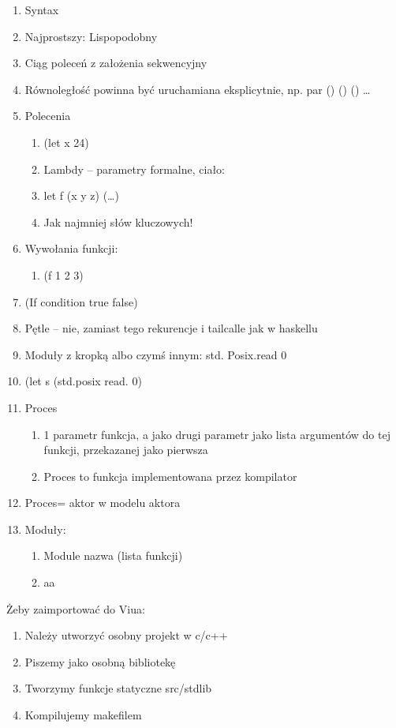 \documentclass[11pt,oneside,a4paper,onecolumn]{article}
\begin{document}
\begin{enumerate}
\item Syntax
\item	Najprostszy: Lispopodobny 
\item	Ciąg poleceń z założenia sekwencyjny
\item	Równoległość powinna być uruchamiana eksplicytnie, np. par () () () …
\item	Polecenia
\begin{enumerate}
	\item (let x 24)
	\item Lambdy – parametry formalne, ciało:
	\item let f (x y z) (…)
	\item Jak najmniej słów kluczowych!
\end{enumerate}
\item Wywołania funkcji:
\begin{enumerate}
	\item (f 1 2 3)
\end{enumerate}
\item (If condition true false)
\item	Pętle – nie, zamiast tego rekurencje i tailcalle jak w haskellu
\item	Moduły z kropką albo czymś innym: std. Posix.read 0
\item	(let s (std.posix read. 0)
\item	Proces
\begin{enumerate}
	\item	1 parametr funkcja, a jako drugi parametr jako lista argumentów do tej funkcji, przekazanej jako pierwsza
	\item Proces to funkcja implementowana przez kompilator
\end{enumerate}
\item	Proces= aktor w modelu aktora
\item	Moduły:	
\begin{enumerate}
	\item	Module nazwa (lista funkcji)
	\item	aa
\end{enumerate}
\end{enumerate}


Żeby zaimportować do Viua:
\begin{enumerate}
\item	Należy utworzyć osobny projekt w c/c++
\item	Piszemy jako osobną bibliotekę
\item	Tworzymy funkcje statyczne src/stdlib
\item	Kompilujemy makefilem
\end{enumerate}
\end{document}
